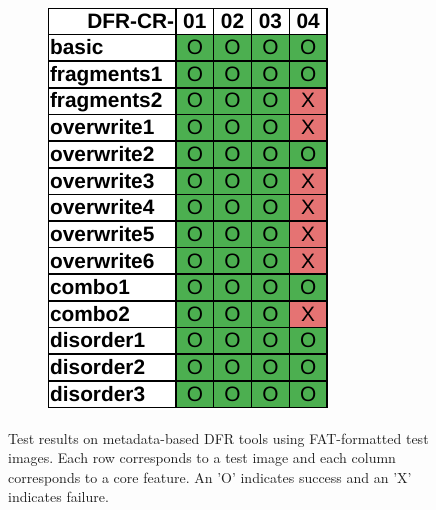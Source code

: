 \begin{figure}
\begin{subfigure}{0.3\linewidth}
        \includegraphics[width=\linewidth]{fig/testdisk_results_fat.pdf}
    \end{subfigure}
        
    \caption{Test results on metadata-based DFR tools using FAT-formatted test images. Each row corresponds to a test image and each column corresponds to a core feature. An 'O' indicates success and an 'X' indicates failure.}
    \label{fig:results_fat}
\end{figure}

